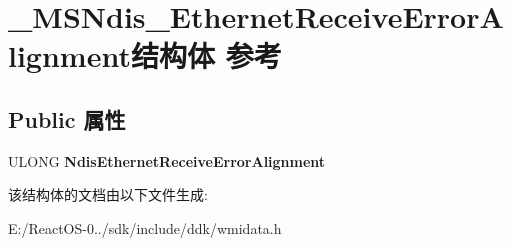 \hypertarget{struct___m_s_ndis___ethernet_receive_error_alignment}{}\section{\+\_\+\+M\+S\+Ndis\+\_\+\+Ethernet\+Receive\+Error\+Alignment结构体 参考}
\label{struct___m_s_ndis___ethernet_receive_error_alignment}
\subsection*{Public 属性}
\begin{DoxyCompactItemize}
\item 
\mbox{\label{struct___m_s_ndis___ethernet_receive_error_alignment_adfbc92974e8b3783d65d7d94ac7d9f47}} 
U\+L\+O\+NG {\bfseries Ndis\+Ethernet\+Receive\+Error\+Alignment}
\end{DoxyCompactItemize}


该结构体的文档由以下文件生成\+:\begin{DoxyCompactItemize}
\item 
E\+:/\+React\+O\+S-\/0../sdk/include/ddk/wmidata.\+h\end{DoxyCompactItemize}
